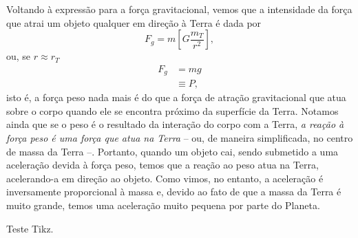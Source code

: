 Voltando à expressão para a força gravitacional, vemos que a intensidade da força que atrai um objeto qualquer em direção à Terra é dada por
\begin{equation}
  F_g = m \left[G \frac{m_T}{r^2}\right],
\end{equation}
%
ou, se $r \approx r_T$
\begin{align}
  F_g &= mg \\
  &\equiv P,
\end{align}
%
isto é, a força peso nada mais é do que a força de atração gravitacional que atua sobre o corpo quando ele se encontra próximo da superfície da Terra. Notamos ainda que se o peso é o resultado da interação do corpo com a Terra, \emph{a reação à força peso é uma força que atua na Terra} -- ou, de maneira simplificada, no centro de massa da Terra --. Portanto, quando um objeto cai, sendo submetido a uma aceleração devida à força peso, temos que a reação ao peso atua na Terra, acelerando-a em direção ao objeto. Como vimos, no entanto, a aceleração é inversamente proporcional à massa e, devido ao fato de que a massa da Terra é muito grande, temos uma aceleração muito pequena por parte do Planeta.
\begin{marginfigure}[-5cm]
\caption{Teste Tikz.}
\end{marginfigure}

